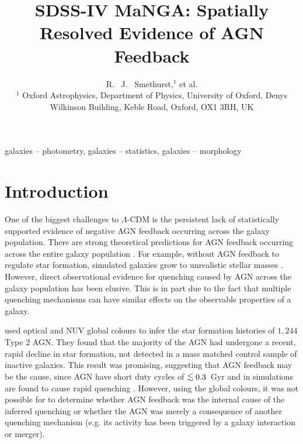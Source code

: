 \documentclass[useAMS,usenatbib]{mn2e}
\def\lesssim{\mathrel{\hbox{\rlap{\hbox{\lower3pt\hbox{$\sim$}}}\hbox{\raise2pt\hbox{$<$}}}}}
\begin{document}
\title[AGN feedback in MaNGA]{SDSS-IV  MaNGA: Spatially Resolved Evidence of AGN Feedback}
\author[Smethurst et al. 2021]{R. ~J. ~Smethurst,$^{1}$ et al.
\\ $^1$ Oxford Astrophysics, Department of Physics, University of Oxford, Denys Wilkinson Building, Keble Road, Oxford, OX1 3RH, UK
}

\maketitle

\begin{abstract}
\end{abstract}

\begin{keywords}
galaxies -- photometry, galaxies -- statistics, galaxies -- morphology
\end{keywords}

\section{Introduction}\label{sec:intro}
One of the biggest challenges to $\Lambda$-CDM is the persistent lack of statistically supported evidence of negative AGN feedback occurring across the galaxy population. There are strong theoretical predictions for AGN feedback occurring across the entire galaxy population \citep{Fabian12, Gaibler12}. For example, without AGN feedback to regulate star formation, simulated galaxies grow to unrealistic stellar masses \citep[e.g.][]{silk12}. However, direct observational evidence for quenching caused by AGN across the galaxy population has been elusive. This is in part due to the fact that multiple quenching mechanisms can have similar effects on the observable properties of a galaxy. 

\citet{smethurst16} used optical and NUV global colours to infer the star formation histories of $1,244$ Type 2 AGN. They found that the majority of the AGN had undergone a recent, rapid decline in star formation, not detected in a mass matched control sample of inactive galaxies. This result was promising, suggesting that AGN feedback may be the cause, since AGN have short duty cycles of $\lesssim0.3$~Gyr \citep{martini04} and in simulations are found to cause rapid quenching \citep{tortora09}. However, using the global colours, it was not possible for \citeauthor{smethurst16} to determine whether AGN feedback was the internal cause of the inferred quenching or whether the AGN was merely a consequence of another quenching mechanism (e.g. its activity has been triggered by a galaxy interaction or merger).
\end{document}

